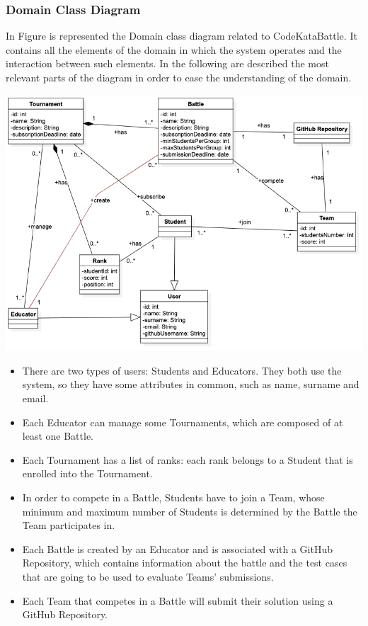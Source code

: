 \documentclass{article}
\begin{document}
\subsubsection{Domain Class Diagram}
In Figure is represented the Domain class diagram related to CodeKataBattle. It contains all the elements of the domain in which the system operates and the interaction between such elements. In the following are described the most relevant parts of the diagram in order to ease the understanding of the domain.
\begin{center}
    \includegraphics[width=1\linewidth]{image17.png}
  \label{fig:domainclass}
\end{center}
\begin{itemize}
\item There are two types of users: Students and Educators. They both use the system, so they have some attributes in common, such as name, surname and email.
\item Each Educator can manage some Tournaments, which are composed of at least one Battle.
\item Each Tournament has a list of ranks: each rank belongs to a Student that is enrolled into the Tournament.
\item In order to compete in a Battle, Students have to join a Team, whose minimum and maximum number of Students is determined by the Battle the Team participates in.
\item Each Battle is created by an Educator and is associated with a GitHub Repository, which contains information about the battle and the test cases that are going to be used to evaluate Teams’ submissions.
\item Each Team that competes in a Battle will submit their solution using a GitHub Repository.
\end{itemize}
\end{document}
